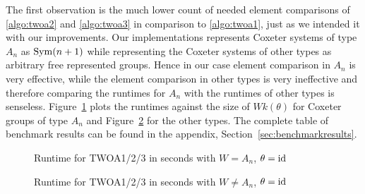 The first observation is the much lower count of needed element comparisons of \ref{algo:twoa2} and \ref{algo:twoa3} in comparison to \ref{algo:twoa1}, just as we intended it with our improvements. Our implementations represents Coxeter systems of type $A_n$ as $\operatorname{Sym}(n+1)$ while representing the Coxeter systems of other types as arbitrary free represented groups. Hence in our case element comparison in $A_n$ is very effective, while the element comparison in other types is very ineffective and therefore comparing the runtimes for $A_n$ with the runtimes of other types is senseless. Figure~\ref{fig:twoa123-runtime-a} plots the runtimes against the size of $Wk(\theta)$ for Coxeter groups of type $A_n$ and Figure~\ref{fig:twoa123-runtime-not-a} for the other types. The complete table of benchmark results can be found in the appendix, Section~\ref{sec:benchmarkresults}.

\begin{figure}[ht]
	\centering
	\caption{Runtime for TWOA1/2/3 in seconds with $W = A_n$, $\theta = \operatorname{id}$}
	\label{fig:twoa123-runtime-a}
\end{figure}

\begin{figure}[ht]
	\centering
	\caption{Runtime for TWOA1/2/3 in seconds with $W \neq A_n$, $\theta = \operatorname{id}$}
	\label{fig:twoa123-runtime-not-a}
\end{figure}

